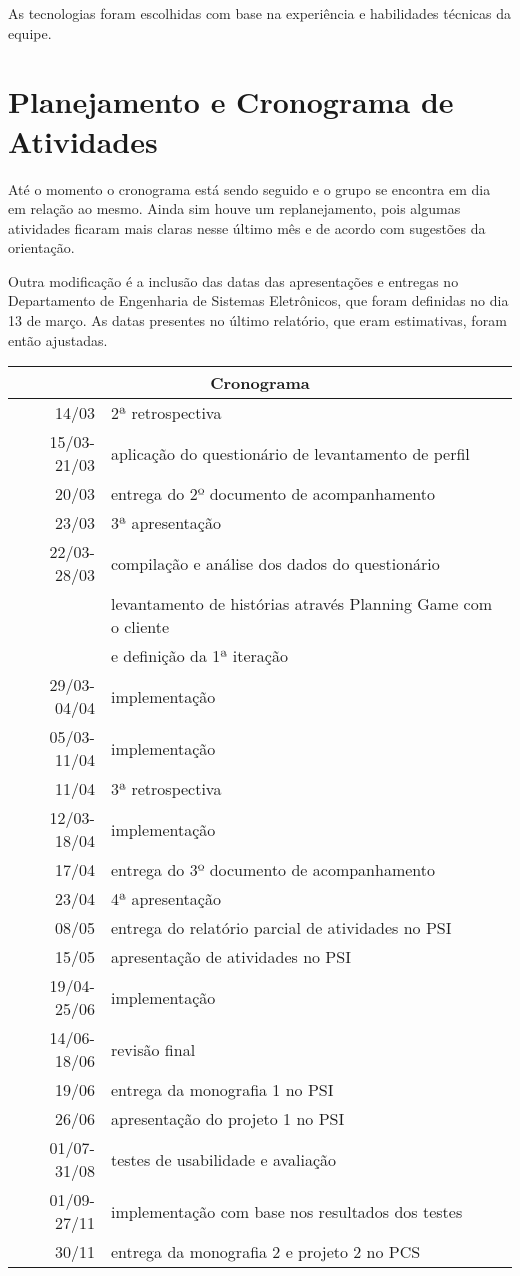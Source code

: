 \documentclass[a4paper,12pt,font=plain,header=plain]{abnt}
\begin{document}
    As tecnologias foram escolhidas com base na experiência e habilidades técnicas da equipe.

  \section{Planejamento e Cronograma de Atividades}

    Até o momento o cronograma está sendo seguido e o grupo se encontra em dia em relação ao mesmo. Ainda sim houve um replanejamento, pois algumas atividades ficaram mais claras nesse último mês e de acordo com sugestões da orientação.

    Outra modificação é a inclusão das datas das apresentações e entregas no Departamento de Engenharia de Sistemas Eletrônicos, que foram definidas no dia 13 de março. As datas presentes no último relatório, que eram estimativas, foram então ajustadas.

		\begin{tabular}[|l|]{ |r|l| }
		\hline
			\multicolumn{2}{|c|}{\large{Cronograma}} \\
		\hline
			14/03 & 2ª retrospectiva \\
		\hline
			15/03-21/03 & aplicação do questionário de levantamento de perfil \\
		\hline
			20/03 & entrega do 2º documento de acompanhamento \\
		\hline
			23/03 & 3ª apresentação \\
		\hline
			22/03-28/03 & compilação e análise dos dados do questionário \\
			 & levantamento de histórias através Planning Game com o cliente \\
			 & e definição da 1ª iteração \\
		\hline
			29/03-04/04 & implementação \\
		\hline
			05/03-11/04 & implementação \\
		\hline
			11/04 & 3ª retrospectiva \\
		\hline
			12/03-18/04 & implementação \\
		\hline
			17/04 & entrega do 3º documento de acompanhamento \\
		\hline
			23/04 & 4ª apresentação \\
    \hline
      08/05 & entrega do relatório parcial de atividades no PSI \\
    \hline
      15/05 & apresentação de atividades no PSI \\
		\hline
			19/04-25/06 & implementação \\
		\hline
			14/06-18/06 & revisão final \\
		\hline
			19/06 & entrega da monografia 1 no PSI \\
		\hline
			26/06 & apresentação do projeto 1 no PSI \\
		\hline
			01/07-31/08 & testes de usabilidade e avaliação \\
		\hline
			01/09-27/11 & implementação com base nos resultados dos testes \\
		\hline
			30/11 & entrega da monografia 2 e projeto 2 no PCS \\
		\hline
		\end{tabular} \\
\end{document}
